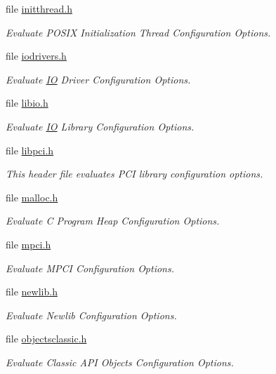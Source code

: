 \begin{DoxyCompactItemize}
file \mbox{\hyperlink{initthread_8h}{initthread.\+h}}
\begin{DoxyCompactList}\small\item\em Evaluate P\+O\+S\+IX Initialization Thread Configuration Options. \end{DoxyCompactList}\item 
file \mbox{\hyperlink{iodrivers_8h}{iodrivers.\+h}}
\begin{DoxyCompactList}\small\item\em Evaluate \mbox{\hyperlink{structIO}{IO}} Driver Configuration Options. \end{DoxyCompactList}\item 
file \mbox{\hyperlink{confdefs_2libio_8h}{libio.\+h}}
\begin{DoxyCompactList}\small\item\em Evaluate \mbox{\hyperlink{structIO}{IO}} Library Configuration Options. \end{DoxyCompactList}\item 
file \mbox{\hyperlink{libpci_8h}{libpci.\+h}}
\begin{DoxyCompactList}\small\item\em This header file evaluates P\+CI library configuration options. \end{DoxyCompactList}\item 
file \mbox{\hyperlink{confdefs_2malloc_8h}{malloc.\+h}}
\begin{DoxyCompactList}\small\item\em Evaluate C Program Heap Configuration Options. \end{DoxyCompactList}\item 
file \mbox{\hyperlink{cpukit_2include_2rtems_2confdefs_2mpci_8h}{mpci.\+h}}
\begin{DoxyCompactList}\small\item\em Evaluate M\+P\+CI Configuration Options. \end{DoxyCompactList}\item 
file \mbox{\hyperlink{newlib_8h}{newlib.\+h}}
\begin{DoxyCompactList}\small\item\em Evaluate Newlib Configuration Options. \end{DoxyCompactList}\item 
file \mbox{\hyperlink{objectsclassic_8h}{objectsclassic.\+h}}
\begin{DoxyCompactList}\small\item\em Evaluate Classic A\+PI Objects Configuration Options. \end{DoxyCompactList}\item 

\end{DoxyCompactItemize}
